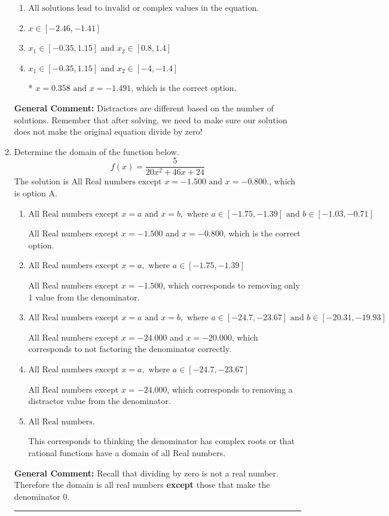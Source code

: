 \documentclass{extbook}[14pt]
\newcommand{\litem}[1]{\item #1

\rule{\textwidth}{0.4pt}}
\begin{document}
\begin{enumerate}
{\begin{enumerate}[label=\Alph*.]
\item \( \text{All solutions lead to invalid or complex values in the equation.} \)


\item \( x \in [-2.46,-1.41] \)


\item \( x_1 \in [-0.35, 1.15] \text{ and } x_2 \in [0.8,1.4] \)


\item \( x_1 \in [-0.35, 1.15] \text{ and } x_2 \in [-4,-1.4] \)

* $x = 0.358 \text{ and } x = -1.491$, which is the correct option.
\end{enumerate}

\textbf{General Comment:} Distractors are different based on the number of solutions. Remember that after solving, we need to make sure our solution does not make the original equation divide by zero!
}
\litem{
Determine the domain of the function below.
\[ f(x) = \frac{5}{20x^{2} +46 x + 24} \]
The solution is \( \text{All Real numbers except } x = -1.500 \text{ and } x = -0.800. \), which is option A.\begin{enumerate}[label=\Alph*.]
\item \( \text{All Real numbers except } x = a \text{ and } x = b, \text{ where } a \in [-1.75, -1.39] \text{ and } b \in [-1.03, -0.71] \)

All Real numbers except $x = -1.500$ and $x = -0.800$, which is the correct option.
\item \( \text{All Real numbers except } x = a, \text{ where } a \in [-1.75, -1.39] \)

All Real numbers except $x = -1.500$, which corresponds to removing only 1 value from the denominator.
\item \( \text{All Real numbers except } x = a \text{ and } x = b, \text{ where } a \in [-24.7, -23.67] \text{ and } b \in [-20.31, -19.93] \)

All Real numbers except $x = -24.000$ and $x = -20.000$, which corresponds to not factoring the denominator correctly.
\item \( \text{All Real numbers except } x = a, \text{ where } a \in [-24.7, -23.67] \)

All Real numbers except $x = -24.000$, which corresponds to removing a distractor value from the denominator.
\item \( \text{All Real numbers.} \)

This corresponds to thinking the denominator has complex roots or that rational functions have a domain of all Real numbers.
\end{enumerate}

\textbf{General Comment:} Recall that dividing by zero is not a real number. Therefore the domain is all real numbers \textbf{except} those that make the denominator 0.
}
\end{enumerate}
\end{document}
